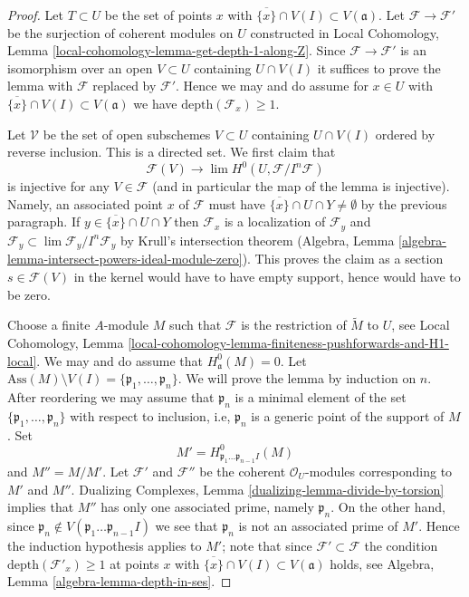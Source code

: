 \begin{proof}
Let $T \subset U$ be the set of points $x$ with
$\overline{\{x\}} \cap V(I) \subset V(\mathfrak a)$.
Let $\mathcal{F} \to \mathcal{F}'$ be the surjection
of coherent modules on $U$ constructed in
Local Cohomology, Lemma \ref{local-cohomology-lemma-get-depth-1-along-Z}.
Since $\mathcal{F} \to \mathcal{F}'$ is an isomorphism
over an open $V \subset U$ containing $U \cap V(I)$
it suffices to prove the lemma with $\mathcal{F}$ replaced
by $\mathcal{F}'$. Hence we may and do assume
for $x \in U$ with $\overline{\{x\}} \cap V(I) \subset V(\mathfrak a)$
we have $\text{depth}(\mathcal{F}_x) \geq 1$.

\medskip\noindent
Let $\mathcal{V}$ be the set of open subschemes $V \subset U$
containing $U \cap V(I)$ ordered by reverse inclusion.
This is a directed set. We first claim that
$$
\mathcal{F}(V)
\longrightarrow
\lim H^0(U, \mathcal{F}/I^n\mathcal{F})
$$
is injective for any $V \in \mathcal{F}$ (and in particular the map
of the lemma is injective). Namely, an associated point $x$ of $\mathcal{F}$
must have $\overline{\{x\}} \cap U \cap Y \not = \emptyset$
by the previous paragraph. If $y \in \overline{\{x\}} \cap U \cap Y$ then
$\mathcal{F}_x$ is a localization of $\mathcal{F}_y$
and $\mathcal{F}_y \subset \lim \mathcal{F}_y/I^n \mathcal{F}_y$
by Krull's intersection theorem
(Algebra, Lemma \ref{algebra-lemma-intersect-powers-ideal-module-zero}).
This proves the claim as a section $s \in \mathcal{F}(V)$
in the kernel would have to have empty support, hence would have to be zero.

\medskip\noindent
Choose a finite $A$-module $M$ such that $\mathcal{F}$ is the restriction
of $\widetilde{M}$ to $U$, see Local Cohomology, Lemma
\ref{local-cohomology-lemma-finiteness-pushforwards-and-H1-local}.
We may and do assume that $H^0_\mathfrak a(M) = 0$.
Let $\text{Ass}(M) \setminus V(I) = \{\mathfrak p_1, \ldots, \mathfrak p_n\}$.
We will prove the lemma by induction on $n$. After reordering we
may assume that $\mathfrak p_n$ is a minimal element of the set
$\{\mathfrak p_1, \ldots, \mathfrak p_n\}$ with respect to inclusion, i.e,
$\mathfrak p_n$ is a generic point of the support of $M$.
Set
$$
M' = H^0_{\mathfrak p_1 \ldots \mathfrak p_{n - 1} I}(M)
$$
and $M'' = M/M'$. Let $\mathcal{F}'$ and $\mathcal{F}''$ be the
coherent $\mathcal{O}_U$-modules corresponding to $M'$ and $M''$.
Dualizing Complexes, Lemma \ref{dualizing-lemma-divide-by-torsion}
implies that $M''$ has only one associated prime, namely $\mathfrak p_n$.
On the other hand, since
$\mathfrak p_n \not \in V(\mathfrak p_1 \ldots \mathfrak p_{n - 1} I)$
we see that $\mathfrak p_n$ is not an associated prime of $M'$.
Hence the induction hypothesis applies to $M'$; note
that since $\mathcal{F}' \subset \mathcal{F}$
the condition $\text{depth}(\mathcal{F}'_x) \geq 1$ at points $x$ with
$\overline{\{x\}} \cap V(I) \subset V(\mathfrak a)$ holds, see
Algebra, Lemma \ref{algebra-lemma-depth-in-ses}.


\end{proof}
